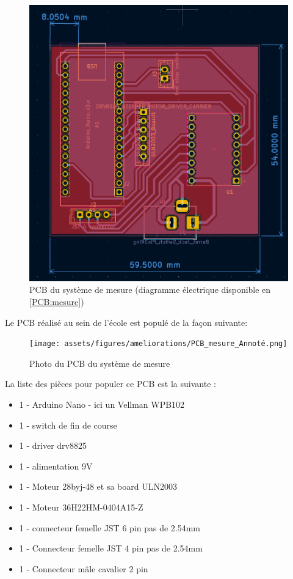 \begin{figure}[H]
    \centering
    \includegraphics[width = \textwidth]{assets/figures/ameliorations/PCB_rotation_translation.png}
    \caption[PCB du système de mesure]{PCB du système de mesure (diagramme électrique disponible en \autoref{PCB:mesure})}
\end{figure}

\newpage
Le PCB réalisé au sein de l'école est populé de la façon suivante:

\begin{figure}[H]
    \centering
    \texttt{[image: assets/figures/ameliorations/PCB\_mesure\_Annoté.png]}
    \caption[Photo du PCB du système de mesure]{Photo du PCB du système de mesure}
\end{figure}

La liste des pièces pour populer ce PCB est la suivante :
\begin{itemize}
    \item 1 - Arduino Nano - ici un Vellman WPB102
    \item 1 - switch de fin de course
    \item 1 - driver drv8825
    \item 1 - alimentation 9V
    \item 1 - Moteur 28byj-48 et sa board ULN2003
    \item 1 - Moteur 36H22HM-0404A15-Z
    \item 1 - connecteur femelle JST 6 pin pas de 2.54mm
    \item 1 - Connecteur femelle JST 4 pin pas de 2.54mm
    \item 1 - Connecteur mâle cavalier 2 pin
\end{itemize}

